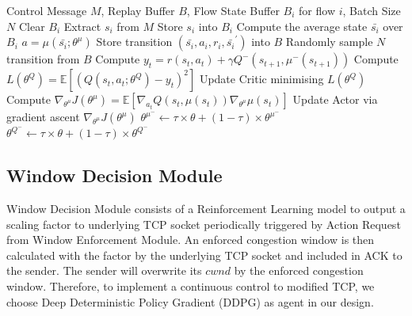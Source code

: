 \documentclass[journal]{IEEEtran}
\begin{document}
\begin{algorithm}[t]
\renewcommand{\algorithmicrequire}{\textbf{Input:}}
\renewcommand{\algorithmicensure}{\textbf{Output:}}
\caption{Window Decision Module}
\label{alg:window_decision_module}
\begin{algorithmic}[1]
\Require Control Message $M$, Replay Buffer $B$, Flow State Buffer $B_i$ for flow $i$, Batch Size $N$
\Ensure 
{}
\State Clear $B_i$
\State Extract $s_i$ from $M$
\State Store $s_i$ into $B_i$
\State Compute the average state $\bar{s_i}$ over $B_i$
\State $a = \mu(\bar{s_i};\theta^{\mu})$
\State Store transition $(\bar{s_i}, a_i, r_i, \bar{s_{i}}^{'})$ into $B$
\State Randomly sample $N$ transition from $B$
\State Compute $y_t=r(s_t,a_t)+\gamma Q^{-}(s_{t+1},\mu^{-}(s_{t+1}))$
\State Compute $L(\theta^Q) = \mathbb{E}[(Q(s_t,a_t;\theta^{Q}) - y_t)^2]$
\State Update Critic minimising $L(\theta^Q)$
\State Compute $\nabla_{\theta^\mu} J(\theta^\mu) = \mathbb{E}[\nabla_{a_t}Q(s_t,\mu(s_t))
\nabla_{\theta^\mu} \mu(s_t)]$
\State Update Actor via gradient ascent $\nabla_{\theta^\mu} J(\theta^\mu)$
\State $\theta^{\mu^-} \leftarrow \tau \times \theta + (1-\tau)\times \theta^{\mu^-}$
\State $\theta^{Q^-} \leftarrow \tau \times \theta + (1-\tau)\times \theta^{Q^-}$
\EndIf
\end{algorithmic}
\end{algorithm}

\subsection{Window Decision Module}
Window Decision Module consists of a Reinforcement Learning model to output a scaling factor to underlying TCP socket periodically triggered by Action Request from Window Enforcement Module.
An enforced congestion window is then calculated with the factor by the underlying TCP socket and included in ACK to the sender. The sender will overwrite its $cwnd$ by the enforced congestion window. Therefore, to implement a continuous control to modified TCP, we choose Deep Deterministic Policy Gradient (DDPG) as agent in our design.
\end{document}
